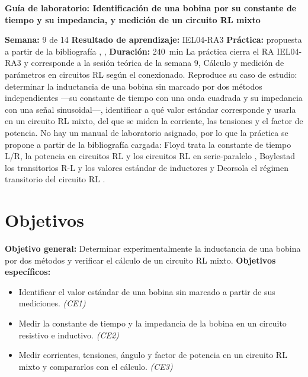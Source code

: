 \documentclass[12pt]{article}
\begin{document}
\nocite{ref1,ref2,ref3}

\datosguia
\lineablanco

{\centering\bfseries Guía de laboratorio: Identificación de una bobina por su constante de tiempo y su impedancia, y medición de un circuito RL mixto\par}
\lineablanco
\textbf{Semana:} 9 de 14 \quad \textbf{Resultado de aprendizaje:} IEL04-RA3 \quad \textbf{Práctica:} propuesta a partir de la bibliografía \cite{ref1}, \cite{ref2}, \cite{ref3} \quad \textbf{Duración:} \SI{240}{\minute}
\lineablanco
La práctica cierra el RA IEL04-RA3 y corresponde a la sesión teórica de la semana 9, \guillemotleft{}Cálculo y medición de parámetros en circuitos RL según el conexionado\guillemotright{}. Reproduce su caso de estudio: determinar la inductancia de una bobina sin marcado por dos métodos independientes ---su constante de tiempo con una onda cuadrada y su impedancia con una señal sinusoidal---, identificar a qué valor estándar corresponde y usarla en un circuito RL mixto, del que se miden la corriente, las tensiones y el factor de potencia. No hay un manual de laboratorio asignado, por lo que la práctica se propone a partir de la bibliografía cargada: Floyd trata la constante de tiempo L/R, la potencia en circuitos RL y los circuitos RL en serie-paralelo \cite{ref1}, Boylestad los transitorios R-L y los valores estándar de inductores \cite{ref2} y Deorsola el régimen transitorio del circuito RL \cite{ref3}.

\section{Objetivos}\label{sec:objetivos}
\textbf{Objetivo general:} Determinar experimentalmente la inductancia de una bobina por dos métodos y verificar el cálculo de un circuito RL mixto.
\lineablanco
\textbf{Objetivos específicos:}
\begin{itemize}
  \item Identificar el valor estándar de una bobina sin marcado a partir de sus mediciones. \emph{(CE1)}
  \item Medir la constante de tiempo y la impedancia de la bobina en un circuito resistivo e inductivo. \emph{(CE2)}
  \item Medir corrientes, tensiones, ángulo y factor de potencia en un circuito RL mixto y compararlos con el cálculo. \emph{(CE3)}
\end{itemize}
\end{document}
